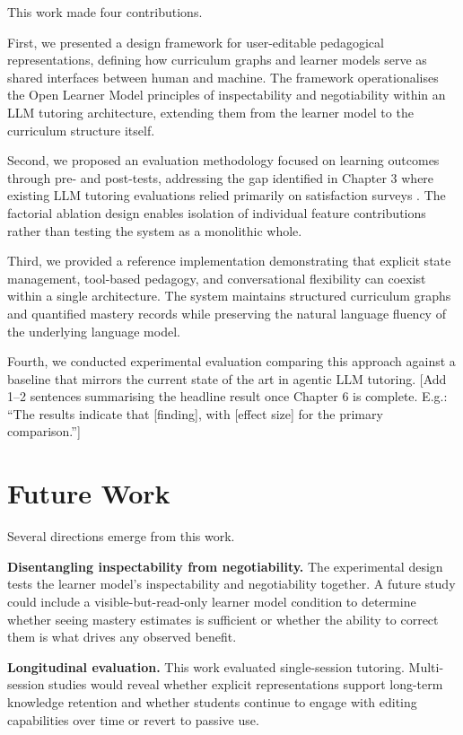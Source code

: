 \documentclass[logo,bsc,singlespacing,parskip,online]{infthesis}
\begin{document}
This work made four contributions.

First, we presented a design framework for user-editable pedagogical representations, defining how curriculum graphs and learner models serve as shared interfaces between human and machine. The framework operationalises the Open Learner Model principles of inspectability and negotiability \citep{bull2007invite, kay2013scrutability} within an LLM tutoring architecture, extending them from the learner model to the curriculum structure itself.

Second, we proposed an evaluation methodology focused on learning outcomes through pre- and post-tests, addressing the gap identified in Chapter 3 where existing LLM tutoring evaluations relied primarily on satisfaction surveys \citep{chen2024chattutor}. The factorial ablation design enables isolation of individual feature contributions rather than testing the system as a monolithic whole.

Third, we provided a reference implementation demonstrating that explicit state management, tool-based pedagogy, and conversational flexibility can coexist within a single architecture. The system maintains structured curriculum graphs and quantified mastery records while preserving the natural language fluency of the underlying language model.

Fourth, we conducted experimental evaluation comparing this approach against a baseline that mirrors the current state of the art in agentic LLM tutoring. [Add 1--2 sentences summarising the headline result once Chapter 6 is complete. E.g.: ``The results indicate that [finding], with [effect size] for the primary comparison.'']

\section{Future Work}

Several directions emerge from this work.

\textbf{Disentangling inspectability from negotiability.} The experimental design tests the learner model's inspectability and negotiability together. A future study could include a visible-but-read-only learner model condition to determine whether seeing mastery estimates is sufficient or whether the ability to correct them is what drives any observed benefit.

\textbf{Longitudinal evaluation.} This work evaluated single-session tutoring. Multi-session studies would reveal whether explicit representations support long-term knowledge retention and whether students continue to engage with editing capabilities over time or revert to passive use.
\end{document}
